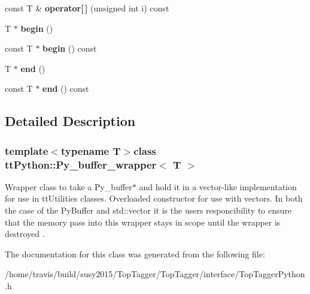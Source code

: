 \begin{DoxyCompactItemize}
\item 
\hypertarget{classttPython_1_1Py__buffer__wrapper_af13e3bfd741987b1823e24a7cd73a26c}{const T \& {\bfseries operator\mbox{[}$\,$\mbox{]}} (unsigned int i) const }\label{classttPython_1_1Py__buffer__wrapper_af13e3bfd741987b1823e24a7cd73a26c}

\item 
\hypertarget{classttPython_1_1Py__buffer__wrapper_a0fa992161236e4454b167740b6e30b97}{T $\ast$ {\bfseries begin} ()}\label{classttPython_1_1Py__buffer__wrapper_a0fa992161236e4454b167740b6e30b97}

\item 
\hypertarget{classttPython_1_1Py__buffer__wrapper_aeacb1dc0fe90db32455f27643881540f}{const T $\ast$ {\bfseries begin} () const }\label{classttPython_1_1Py__buffer__wrapper_aeacb1dc0fe90db32455f27643881540f}

\item 
\hypertarget{classttPython_1_1Py__buffer__wrapper_a41c4971f28ee2ed808d5250b5c47bbc2}{T $\ast$ {\bfseries end} ()}\label{classttPython_1_1Py__buffer__wrapper_a41c4971f28ee2ed808d5250b5c47bbc2}

\item 
\hypertarget{classttPython_1_1Py__buffer__wrapper_a7670be3ca39ee4cd6756ee324f54e554}{const T $\ast$ {\bfseries end} () const }\label{classttPython_1_1Py__buffer__wrapper_a7670be3ca39ee4cd6756ee324f54e554}

\end{DoxyCompactItemize}


\subsection{Detailed Description}
\subsubsection*{template$<$typename T$>$class tt\-Python\-::\-Py\-\_\-buffer\-\_\-wrapper$<$ T $>$}

Wrapper class to take a Py\-\_\-buffer$\ast$ and hold it in a vector-\/like implementation for use in tt\-Utilities classes. Overloaded constructor for use with vectors. In both the case of the Py\-Buffer and std\-::vector it is the users responcibility to ensure that the memory pass into this wrapper stays in scope until the wrapper is destroyed . 

The documentation for this class was generated from the following file\-:\begin{DoxyCompactItemize}
\item 
/home/travis/build/susy2015/\-Top\-Tagger/\-Top\-Tagger/interface/Top\-Tagger\-Python.\-h\end{DoxyCompactItemize}

